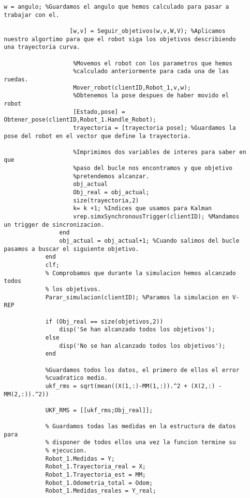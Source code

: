 \begin{lstlisting}[frame=single]
                   w = angulo; %Guardamos el angulo que hemos calculado para pasar a trabajar con el.
                   
                   [w,v] = Seguir_objetivos(w,v,W,V); %Aplicamos nuestro algortimo para que el robot siga los objetivos describiendo una trayectoria curva.

                    %Movemos el robot con los parametros que hemos
                    %calculado anteriormente para cada una de las ruedas.
                    Mover_robot(clientID,Robot_1,v,w);
                    %Obtenemos la pose despues de haber movido el robot
                    [Estado,pose] = Obtener_pose(clientID,Robot_1.Handle_Robot);
                    trayectoria = [trayectoria pose]; %Guardamos la pose del robot en el vector que define la trayectoria.

                    %Imprimimos dos variables de interes para saber en que
                    %paso del bucle nos encontramos y que objetivo
                    %pretendemos alcanzar.
                    obj_actual
                    Obj_real = obj_actual;
                    size(trayectoria,2)
                    k= k +1; %Indices que usamos para Kalman
                    vrep.simxSynchronousTrigger(clientID); %Mandamos un trigger de sincronizacion.
                end
                obj_actual = obj_actual+1; %Cuando salimos del bucle pasamos a buscar el siguiente objetivo.
            end
            clf;
            % Comprobamos que durante la simulacion hemos alcanzado todos
            % los objetivos.
            Parar_simulacion(clientID); %Paramos la simulacion en V-REP
            
            if (Obj_real == size(objetivos,2))
                disp('Se han alcanzado todos los objetivos');
            else 
                disp('No se han alcanzado todos los objetivos');
            end

            %Guardamos todos los datos, el primero de ellos el error
            %cuadratico medio.
            ukf_rms = sqrt(mean((X(1,:)-MM(1,:)).^2 + (X(2,:) - MM(2,:)).^2))

            UKF_RMS = [[ukf_rms;Obj_real]];
            
            % Guardamos todas las medidas en la estructura de datos para
            % disponer de todos ellos una vez la funcion termine su
            % ejecucion.
            Robot_1.Medidas = Y;
            Robot_1.Trayectoria_real = X;
            Robot_1.Trayectoria_est = MM;
            Robot_1.Odometria_total = Odom;
            Robot_1.Medidas_reales = Y_real;


\end{lstlisting}
